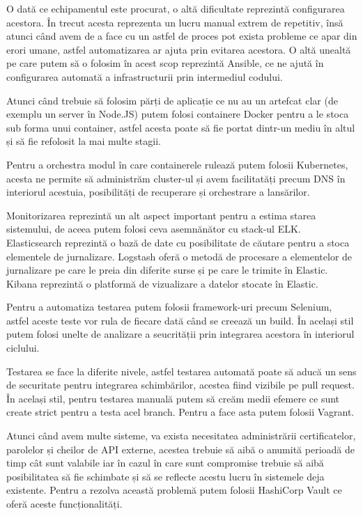 O dată ce echipamentul este procurat, o altă dificultate reprezintă configurarea acestora. În trecut
acesta reprezenta un lucru manual extrem de repetitiv, însă atunci când avem de a face
cu un astfel de proces pot exista probleme ce apar din erori umane, astfel
automatizarea ar ajuta prin evitarea acestora. O altă unealtă pe care putem să o folosim
în acest scop reprezintă Ansible, ce ne ajută în configurarea automată a infrastructurii
prin intermediul codului.

Atunci când trebuie să folosim părți de aplicație ce nu au un artefcat clar (de
exemplu un server în Node.JS) putem folosi containere Docker pentru a le stoca
sub forma unui container, astfel acesta poate să fie portat dintr-un mediu în altul și
să fie refolosit la mai multe stagii.

Pentru a orchestra modul în care containerele rulează putem folosii Kubernetes, acesta
ne permite să administrăm cluster-ul și avem facilitatăți precum DNS în interiorul acestuia,
posibilități de recuperare și orchestrare a lansărilor.

Monitorizarea reprezintă un alt aspect important pentru a estima starea sistemului,
de aceea putem folosi ceva asemnănător cu stack-ul ELK. Elasticsearch reprezintă
o bază de date cu posibilitate de căutare pentru a stoca elementele de jurnalizare.
Logstash oferă o metodă de procesare a elementelor de jurnalizare pe care le
preia din diferite surse și pe care le trimite în Elastic. Kibana reprezintă o platformă de vizualizare a
datelor stocate în Elastic.

Pentru a automatiza testarea putem folosii framework-uri precum Selenium, astfel
aceste teste vor rula de fiecare dată când se creează un build. În același stil
putem folosi unelte de analizare a seucrității prin integrarea acestora în interiorul
ciclului.

Testarea se face la diferite nivele, astfel testarea automată poate să aducă
un sens de securitate pentru integrarea schimbărilor, acestea fiind vizibile
pe pull request. În același stil, pentru testarea manuală putem să creăm medii efemere
ce sunt create strict pentru a testa acel branch. Pentru a face asta putem folosii Vagrant.

Atunci când avem multe sisteme, va exista necesitatea administrării certificatelor,
parolelor și cheilor de API externe, acestea trebuie să aibă o anumită perioadă de timp
cât sunt valabile iar în cazul în care sunt compromise trebuie să aibă posibilitatea
să fie schimbate și să se reflecte acestu lucru în sistemele deja existente. Pentru a rezolva
această problemă putem folosii HashiCorp Vault ce oferă aceste funcționalități.


